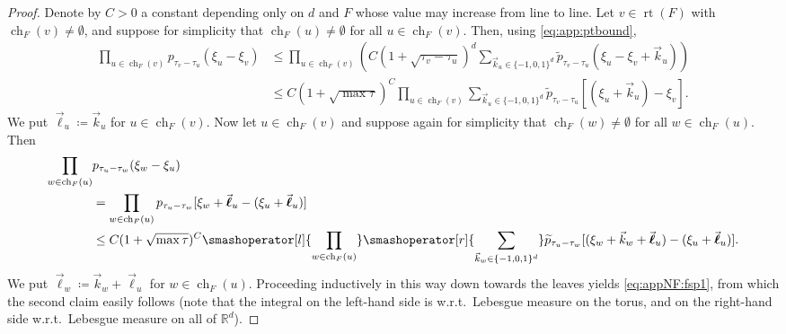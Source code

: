 \documentclass[reqno,draft]{amsart}
\numberwithin{equation}{section}
\theoremstyle{plain}
\theoremstyle{remark}
\newcommand{\R}{\mathbb{R}} %
\DeclareMathOperator{\ch}{ch}
\DeclareMathOperator{\rt}{rt}
\newcommand{\rfy}[1]{\widetilde{{#1}}} %
\begin{document}
\begin{proof}
    Denote by $C > 0$ a constant depending only on $d$ and $F$ whose value may increase from line to line. Let $v\in \rt(F)$ with $\ch_F(v) \neq \emptyset $, and suppose for simplicity that $\ch_F(u) \neq \emptyset $ for all $u\in \ch_F(v)$. Then, using \cref{eq:app:ptbound},
    \begin{align*}
        \prod_{u\in \ch_F(v)} p_{\tau_v-\tau_u}(\xi_u - \xi_v)
        &\le \prod_{u\in \ch_F(v)} \left( C (1 + \sqrt{\tau_v - \tau_u}  ) ^d \sum_{\vec{k}_u\in \{-1,0,1\}^d} \rfy{p}_{\tau_v-\tau_u}(\xi_u - \xi_v +  \vec{k}_u)\right)\\
        &\le C (1 + \sqrt{\max \tau} )^{C} \prod_{u\in \ch_F(v)} \sum_{\vec{k}_u \in \{-1,0,1\}^d} \rfy{p}_{\tau_v-\tau_u}[(\xi_u +  \vec{k}_u) - \xi_v].
    \end{align*}
    We put $\vec{\boldsymbol \ell}_u \coloneqq \vec{k}_u$ for $u\in \ch_F(v)$. Now let $u\in \ch_F(v)$ and suppose again for simplicity that $\ch_F(w) \neq \emptyset $ for all $w\in \ch_F(u)$. Then
    \begin{align*}
        \prod_{w\in \ch_F(u)}& p_{\tau_u - \tau_w}(\xi_w - \xi_u)\\
        &= \prod_{w\in \ch_F(u)} p_{\tau_u - \tau_w}[\xi_w +  \vec{\boldsymbol \ell}_u - (\xi_u +  \vec{\boldsymbol \ell}_u)]\\
        &\le C (1 + \sqrt{\max \tau} )^C \smashoperator[l]{\prod_{w\in \ch_F(u)}} \smashoperator[r]{\sum_{\vec{k}_w \in \{-1,0,1\}^d}} \rfy{p}_{\tau_u - \tau_w} [(\xi_w +  \vec{k}_w +  \vec{\boldsymbol \ell}_u) - (\xi_u +  \vec{\boldsymbol \ell}_u)].
    \end{align*}
    We put $\vec{\boldsymbol \ell}_w \coloneqq \vec{k}_w + \vec{\boldsymbol \ell}_u$ for $w\in \ch_F(u)$. Proceeding inductively in this way down towards the leaves yields \cref{eq:appNF:fsp1}, from which the second claim easily follows (note that the integral on the left-hand side is w.r.t.\ Lebesgue measure on the torus, and on the right-hand side w.r.t.\ Lebesgue measure on all of $\R^d$).

\end{proof}
\end{document}
